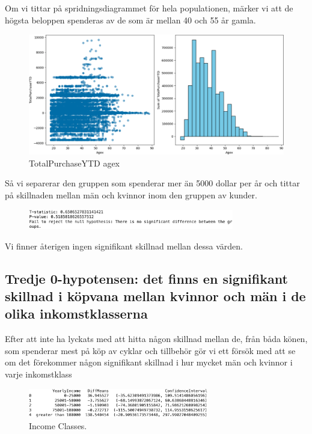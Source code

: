 \documentclass[10pt]{article}
\begin{document}
Om vi tittar på spridningsdiagrammet för hela populationen, märker vi att de högsta beloppen spenderas av de som är mellan 40 och 55 år gamla.
\begin{figure}[h]
    \centering
    \includegraphics[width=\textwidth]{img_total_purchase_ytd_agex.png}
    \caption{TotalPurchaseYTD agex}
\end{figure}
Så vi separerar den gruppen som spenderar mer än 5000 dollar per år och tittar på skillnaden mellan män och kvinnor inom den gruppen av kunder.
\begin{figure}[h]
    \centering
    \includegraphics[width=0.8\textwidth]{img_spenderarklassen.png}
\end{figure}

\noindent Vi finner återigen ingen signifikant skillnad mellan dessa värden.








\subsection{Tredje 0-hypotensen: det finns en signifikant skillnad i köpvana mellan kvinnor och män i de olika inkomstklasserna}

Efter att inte ha lyckats med att hitta någon skillnad mellan de, från båda könen, som spenderar mest på köp av cyklar och tillbehör gör vi ett försök med att se om det förekommer någon signifikant skillnad i hur mycket män och kvinnor i varje inkomstklass
\begin{figure}[h]
    \centering
    \includegraphics[width=0.7\textwidth]{img_income_classes.png}
    \caption{Income Classes.}
\end{figure}
\end{document}
